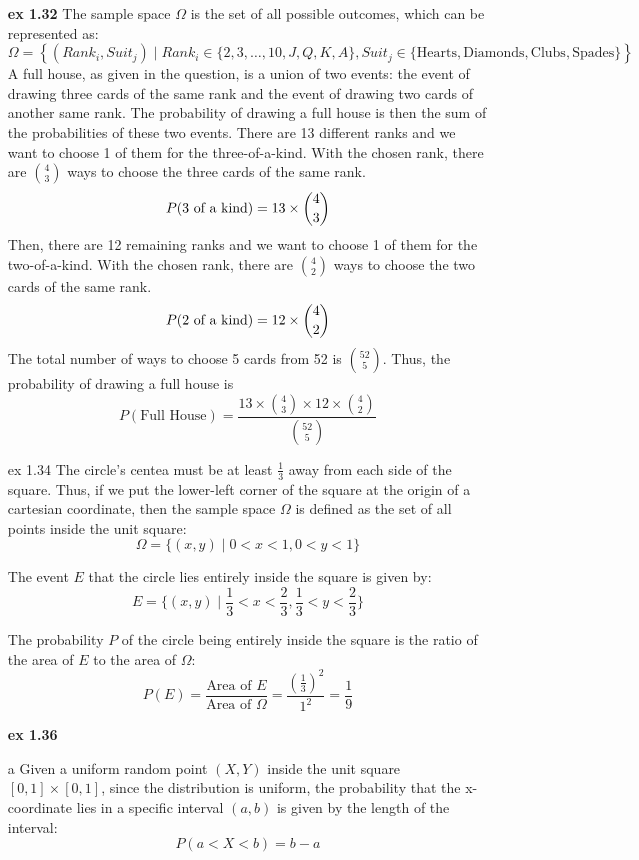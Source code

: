 \documentclass{article}
\begin{document}
\begin{itemize}
      \item[\textbf{ex 1.32}]
            The sample space $\Omega$ is the set of all possible outcomes, which can be represented as:
            \[
                  \Omega = \left\{ (Rank_i, Suit_j) \mid Rank_i \in \{2, 3, \ldots, 10, J, Q, K, A\}, Suit_j \in \{\text{Hearts}, \text{Diamonds}, \text{Clubs}, \text{Spades}\} \right\}
            \]
            A full house, as given in the question, is a union of two events: the event of drawing three cards of the same rank and the event of drawing two cards of another same rank. The probability of drawing a full house is then the sum of the probabilities of these two events.
            There are 13 different ranks and we want to choose 1 of them for the three-of-a-kind. With the chosen rank, there are $\binom{4}{3}$ ways to choose the three cards of the same rank. $$P(\rm \text{3 of a kind})= 13\times \binom{4}{3}$$
            Then, there are 12 remaining ranks and we want to choose 1 of them for the two-of-a-kind. With the chosen rank, there are $\binom{4}{2}$ ways to choose the two cards of the same rank. $$P(\rm \text{2 of a kind})= 12\times \binom{4}{2}$$
            The total number of ways to choose 5 cards from 52 is $\binom{52}{5}$.
            Thus, the probability of drawing a full house is \begin{equation*}
                  P(\text{Full House}) = \frac{13\times \binom{4}{3} \times 12\times \binom{4}{2}}{\binom{52}{5}}
            \end{equation*}


      \item[ex 1.34]  The circle's centea must be at least $\frac{1}{3}$ away from each side of the square. Thus, if we put the lower-left corner of the square at the origin of a cartesian coordinate,
            then the sample space $\Omega$ is defined as the set of all points inside the unit square:
            \[ \Omega = \{(x, y) \mid 0 < x < 1, 0 < y < 1\} \]

            The event $E$ that the circle lies entirely inside the square is given by:
            \[ E = \{(x, y) \mid \frac{1}{3} < x < \frac{2}{3}, \frac{1}{3} < y < \frac{2}{3}\} \]

            The probability $P$ of the circle being entirely inside the square is the ratio of the area of $E$ to the area of $\Omega$:
            \[ P(E) = \frac{\text{Area of } E}{\text{Area of } \Omega} = \frac{\left(\frac{1}{3}\right)^2}{1^2} = \frac{1}{9} \]

      \item[\textbf{ex 1.36}]
      \item[a]  Given a uniform random point $(X, Y)$ inside the unit square $[0, 1] \times [0, 1]$, since the distribution is uniform, the probability that the x-coordinate lies in a specific interval $(a, b)$ is given by the length of the interval:
      \[ P(a < X < b) = b - a \]
      

\end{itemize}
\end{document}
